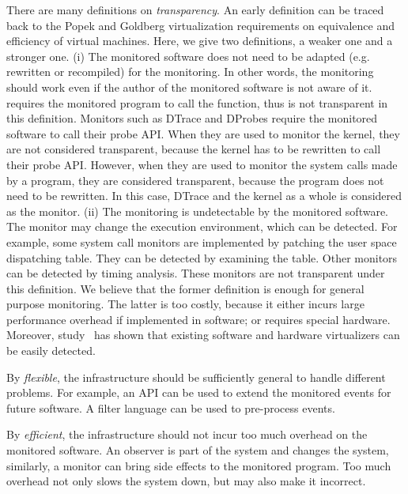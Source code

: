 There are many definitions on {\em transparency}.
An early definition can be traced back to the Popek and Goldberg
virtualization requirements \cite{popek1974formal} on
equivalence and efficiency of virtual machines.
Here, we give two definitions, a weaker one and a stronger one.
(i) The monitored software does not need to be adapted (e.g. rewritten or
recompiled) for the monitoring.
In other words, the monitoring should work even if the author of the
monitored software is not aware of it.
 requires the monitored program to call the
 function, thus  is not transparent
in this definition.
Monitors such as DTrace and DProbes require the monitored
software to call their probe API.
When they are used to monitor the kernel, they are not considered transparent,
because the kernel has to be rewritten to call their probe API.
However, when they are used to monitor the system calls made by a program,
they are considered transparent, because the program does not need to be
rewritten.
In this case, DTrace and the kernel as a whole is considered as the monitor.
(ii) The monitoring is undetectable by the monitored software.
The monitor may change the execution environment, which can be detected.
For example, some system call monitors are implemented by patching the
user space dispatching table.
They can be detected by examining the table.
Other monitors can be detected by timing analysis.
These monitors are not transparent under this definition.
We believe that the former definition is enough for general purpose monitoring.
The latter is too costly,
because it either incurs large performance overhead if implemented in software;
or requires special hardware.
Moreover, study~\cite{raffetseder2007detecting,garfinkel2007compatibility}
has shown that existing software
and hardware virtualizers can be easily detected.

By {\em flexible}, the infrastructure should be sufficiently general to
handle different problems.
For example, an API can be used to extend the monitored events for future software.
A filter language can be used to pre-process events.

By {\em efficient}, the infrastructure should not incur too much
overhead on the monitored software.
An observer is part of the system and changes the system, similarly,
a monitor can bring side effects to the monitored program.
Too much overhead not only slows the system down, but may also make
it incorrect.

